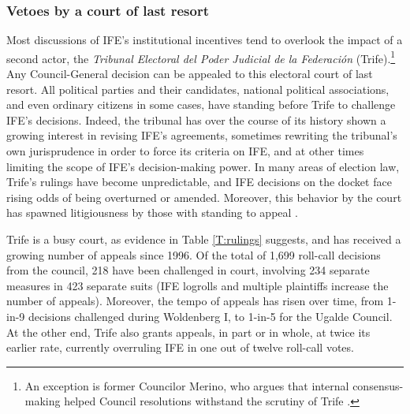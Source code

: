 \documentclass[12 pt, letter]{article}
\begin{document}
\subsubsection{Vetoes by a court of last resort}
Most discussions of IFE's institutional incentives tend to overlook
the impact of a second actor, the \emph{Tribunal Electoral del Poder
Judicial de la Federaci\'on} ({\sc Trife}).\footnote{An exception is
former Councilor Merino, who argues that internal consensus-making
helped Council resolutions withstand the scrutiny of {\sc Trife}
\citep{Merino1999}.}  Any Council-General decision can be appealed
to this electoral court of last resort.  All political parties and
their candidates, national political associations, and even ordinary
citizens in some cases, have standing before {\sc Trife} to
challenge IFE's decisions.  Indeed, the tribunal has over the course
of its history shown a growing interest in revising IFE's
agreements, sometimes rewriting the tribunal's own jurisprudence in
order to force its criteria on IFE, and at other times limiting the
scope of IFE's decision-making power.  In many areas of election
law, {\sc Trife}'s rulings have become unpredictable, and IFE
decisions on the docket face rising odds of being overturned or
amended.  Moreover, this behavior by the court has spawned
litigiousness by those with standing to appeal
\citep{Eisenstadt2004}.


{\sc Trife} is a busy court, as evidence in Table \ref{T:rulings}
suggests, and has received a growing number of appeals since 1996.
Of the total of 1,699 roll-call decisions from the council, 218 have
been challenged in court, involving 234 separate measures in 423
separate suits (IFE logrolls and multiple plaintiffs increase the
number of appeals).  Moreover, the tempo of appeals has risen over
time, from 1-in-9 decisions challenged during Woldenberg I, to
1-in-5 for the Ugalde Council.  At the other end, {\sc Trife} also
grants appeals, in part or in whole, at twice its earlier rate,
currently overruling IFE in one out of twelve roll-call votes.
\end{document}
